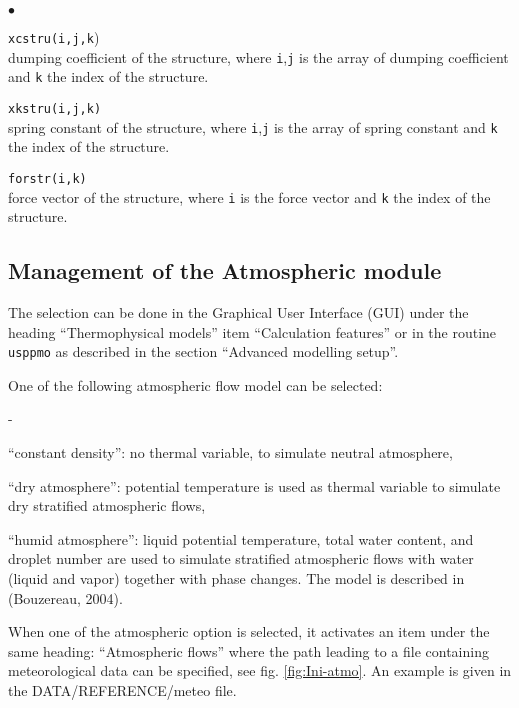 {\begin{list}{$\bullet$}{}
\item{\texttt{xcstru(i,j,k})}\\
{dumping coefficient of the structure, where \texttt{i},\texttt{j} is the array of
dumping coefficient and \texttt{k} the index of the structure.}

\item{\texttt{xkstru(i,j,k)}}\\
{spring constant of the structure, where \texttt{i},\texttt{j} is the array of spring
constant and \texttt{k} the index of the structure.}

\item{\texttt{forstr(i,k)}}\\
{force vector of the structure, where \texttt{i} is the force vector and
\texttt{k} the index of the structure.}
\end{list}

\subsection{Management of the Atmospheric module}

The selection can be done in the Graphical User Interface (GUI)
 under the heading ``Thermophysical models'' item ``Calculation features''
or in the routine \texttt{usppmo} as described in the section ``Advanced modelling setup''.

One of the following atmospheric flow model can be selected:
\begin{list}{-}{}
 \item ``constant density'': no thermal variable, to simulate neutral atmosphere,
 \item ``dry atmosphere'': potential temperature is used as thermal variable to simulate dry stratified
atmospheric flows,
 \item ``humid atmosphere'': liquid potential temperature, total water content, and droplet number are
used to simulate stratified atmospheric flows with water (liquid and vapor) together with phase changes.
The model is described in (Bouzereau, 2004).
\end{list}

When one of the atmospheric option is selected, it activates an item under the same heading:
``Atmospheric flows'' where the path leading to a file containing meteorological data can be specified, see
 fig. \ref {fig:Ini-atmo}. An example is given in the DATA/REFERENCE/meteo file.

}

